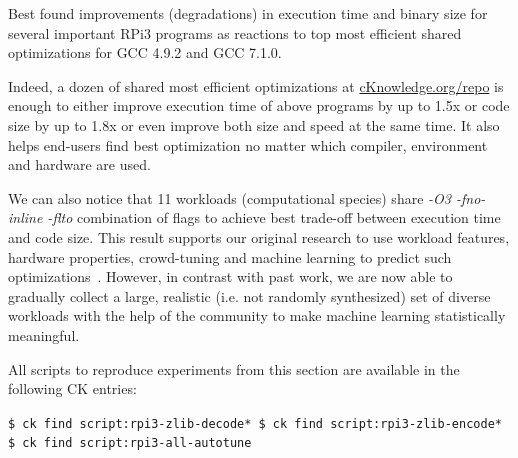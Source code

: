   \begin{table}[]
    \centering
    \caption{
      Best found improvements (degradations) in execution time and binary size 
      for several important RPi3 programs 
      as reactions to top most efficient shared optimizations 
      for GCC 4.9.2 and GCC 7.1.0.
    }
    \label{fig:crowdtuning-all-rpi3-progs}
  \end{table}

Indeed, a dozen of shared most efficient optimizations at \href{http://cKnowledge.org/repo}{cKnowledge.org/repo} 
is enough to either improve execution time of above programs by up to 1.5x or code size by up to 1.8x or even
improve both size and speed at the same time.
%
It also helps end-users find best optimization no matter which compiler, environment and hardware are used.

We can also notice that 11 workloads (computational species) 
share \textit{-O3 -fno-inline -flto} combination of flags 
to achieve best trade-off between execution time and code size.
%
This result supports our original research to use workload features, 
hardware properties, crowd-tuning and  machine learning
to predict such optimizations~\cite{Fur2009,29db2248aba45e59:a31e374796869125,cm:29db2248aba45e59:cd11e3a188574d80}.
%
However, in contrast with past work, we are now able
to gradually collect a large, realistic (i.e. not randomly
synthesized) set of diverse workloads with the help of the
community to make machine learning statistically meaningful.

All scripts to reproduce experiments from this section are available in the following CK entries:

\begin{flushleft}
\texttt{\$ ck find script:rpi3-zlib-decode*\newline
\$ ck find script:rpi3-zlib-encode*\newline
\$ ck find script:rpi3-all-autotune}
\end{flushleft}

